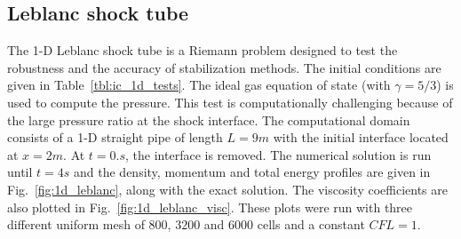 \documentclass[preprint,10pt]{elsarticle}
\newcommand{\fig}[1]{Fig.~\ref{#1}}                      %
\newcommand{\tbl}[1]{Table~\ref{#1}}                     %
\begin{document}
\subsection{Leblanc shock tube} \label{sec:Leblanc}

The 1-D Leblanc shock tube is a Riemann problem designed to test the robustness and the accuracy of stabilization methods. The initial conditions are given in \tbl{tbl:ic_1d_tests}. The ideal gas equation of state (with $\gamma=5/3$) is used to compute the pressure. %
This test is computationally challenging because of the large pressure ratio at the shock interface.
The computational domain consists of a 1-D straight pipe of length $L=9m$ with the initial interface located at $x=2m$. At $t=0.s$, the interface is removed. The numerical solution is run until $t=4 s$ and the density, momentum and total energy profiles are given in \fig{fig:1d_leblanc}, along with the exact solution. The viscosity coefficients are also plotted in \fig{fig:1d_leblanc_visc}. These plots were  run with three different uniform mesh of $800$, $3200$ and $6000$ cells and a constant $CFL = 1$.
\end{document}
